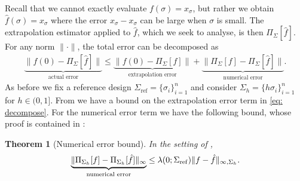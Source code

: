\documentclass[10pt]{article} %
\newcommand{\nugget}{\sigma}
\newcommand{\nuggets}{\Sigma}
\newtheorem{theorem}{Theorem}
\begin{document}
Recall that we cannot exactly evaluate $f(\nugget) = x_\nugget$, but rather we obtain $\hat{f}(\nugget) = \hat{x}_\nugget$ where the error $\hat{x}_\nugget - x_\nugget$ can be large when $\nugget$ is small.
The extrapolation estimator applied to $\hat{f}$, which we seek to analyse, is then $\Pi_{\nuggets}[\hat{f}]$.
For any norm $\|\cdot\|$, the total error can be decomposed as
\begin{align}
\underbrace{ \| f(0) - \Pi_{\nuggets}[\hat{f}] \| }_{\text{actual error}} \leq \underbrace{ \| f(0) - \Pi_{\nuggets}[f] \| }_{\text{extrapolation error}} + \underbrace{ \| \Pi_{\nuggets}[f] - \Pi_{\nuggets}[\hat{f}] \| }_{\text{numerical error}} . \label{eq: decompose}
\end{align}
As before we fix a reference design $\nuggets_{\mathrm{ref}} = \{\nugget_i\}_{i=1}^n$ and consider $\nuggets_h = \{h \nugget_i\}_{i=1}^n$ for $h \in (0,1]$.
From  we have a bound on the extrapolation error term in \eqref{eq: decompose}.
For the numerical error term we have the following bound, whose proof is contained in :

\begin{theorem}[Numerical error bound]
\label{thm: num er}
In the setting of , 
$$
\underbrace{ \| \Pi_{\nuggets_h}[f] - \Pi_{\nuggets_h}[\hat{f}] \|_\infty }_{\text{\normalfont numerical error}} 
\leq \lambda(0;\nuggets_{\mathrm{ref}}) \| f - \hat{f}  \|_{\infty, \nuggets_h} .
$$
\end{theorem}
\end{document}
